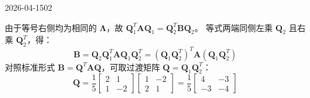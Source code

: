 \begin{mistake}{2026-04-15}{02}
\begin{solutioncontent}
由于等号右侧均为相同的 \(\boldsymbol{\Lambda}\)，故 \(\boldsymbol{Q}_1^T\boldsymbol{A}\boldsymbol{Q}_1 = \boldsymbol{Q}_2^T\boldsymbol{B}\boldsymbol{Q}_2\)。
等式两端同侧左乘 \(\boldsymbol{Q}_2\) 且右乘 \(\boldsymbol{Q}_2^T\)，得：
\[ \boldsymbol{B} = \boldsymbol{Q}_2\boldsymbol{Q}_1^T\boldsymbol{A}\boldsymbol{Q}_1\boldsymbol{Q}_2^T = (\boldsymbol{Q}_1\boldsymbol{Q}_2^T)^T\boldsymbol{A}(\boldsymbol{Q}_1\boldsymbol{Q}_2^T) \]
对照标准形式 \(\boldsymbol{B} = \boldsymbol{Q}^T\boldsymbol{A}\boldsymbol{Q}\)，可取过渡矩阵 \(\boldsymbol{Q} = \boldsymbol{Q}_1\boldsymbol{Q}_2^T\)：
\[
\boldsymbol{Q} = \frac{1}{5}\begin{bmatrix} 2 & 1 \\ 1 & -2 \end{bmatrix}\begin{bmatrix} 1 & -2 \\ 2 & 1 \end{bmatrix} = \frac{1}{5}\begin{bmatrix} 4 & -3 \\ -3 & -4 \end{bmatrix}
\]
\end{solutioncontent}


\end{mistake}
